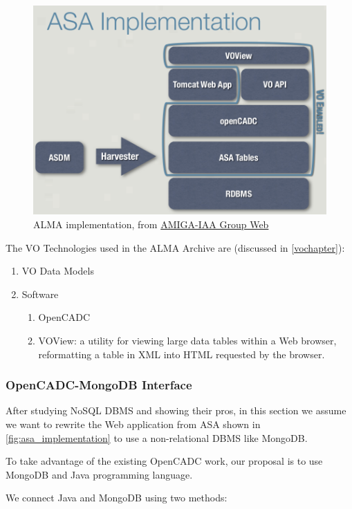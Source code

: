 \label{fig:asa_implementation}
\begin{figure}
\centering
\includegraphics[height=8cm]{images/asa_implementation.png}
\caption{ALMA implementation, from  \href{http://amiga.iaa.es/FCKeditor/UserFiles/File/VOandALMAarchive_web.pdf}{AMIGA-IAA Group Web}}
\end{figure}


The VO Technologies used in the ALMA Archive are (discussed in \ref{vochapter}):

\begin{enumerate}
\item VO Data Models
\item Software
  \begin{enumerate}
    \item OpenCADC
    \item VOView: a utility for viewing large data tables within a Web browser, reformatting a table in XML into HTML requested by the browser.
  \end{enumerate}
\end{enumerate}

\subsubsection{OpenCADC-MongoDB Interface}


After studying NoSQL DBMS and showing their pros, in this section we assume we want to rewrite the Web application from ASA shown in \ref{fig:asa_implementation} to use a non-relational DBMS like MongoDB.

To take advantage of the existing OpenCADC work, our proposal is to use MongoDB and Java programming language.

We connect Java and MongoDB using two methods:

